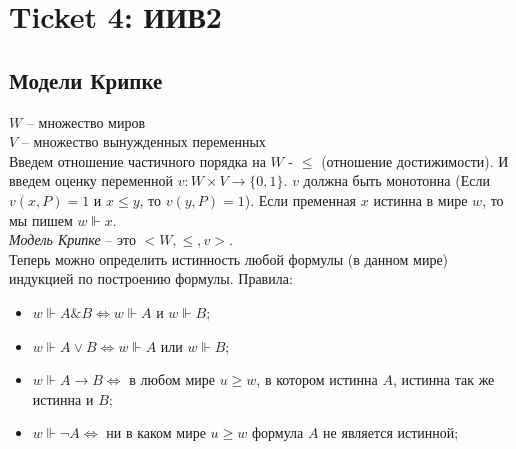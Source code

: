 \section{Ticket 4: ИИВ2}
\label{sec-6}
\subsection{Модели Крипке}
\label{sec-6-1}
$W$ -- множество миров\\
$V$ -- множество вынужденных переменных\\
Введем отношение частичного порядка на $W$ - $\leq$ (отношение достижимости). И введем оценку переменной $v: W \times V \rightarrow \lbrace 0, 1 \rbrace$. $v$ должна быть монотонна (Если $v(x, P) = 1$ и $x \leq y$, то $v(y, P) = 1$). Если пременная $x$ истинна в мире $w$, то мы пишем $w \Vdash x$.\\
\emph{Модель Крипке} -- это $<W, \leq, v>$.\\
Теперь можно определить истинность любой формулы (в данном мире) индукцией по построению формулы. Правила:
\begin{itemize}
\item $w \Vdash A \& B \Leftrightarrow w \Vdash A$ и $w \Vdash B$;
\item $w \Vdash A \vee B \Leftrightarrow w \Vdash A$ или $w \Vdash B$;
\item $w \Vdash A \rightarrow B \Leftrightarrow$ в любом мире $u \geq w$, в котором истинна $A$, истинна так же истинна и $B$;
\item $w \Vdash \neg A \Leftrightarrow$ ни в каком мире $u \geq w$ формула $A$ не является истинной;
\end{itemize}
